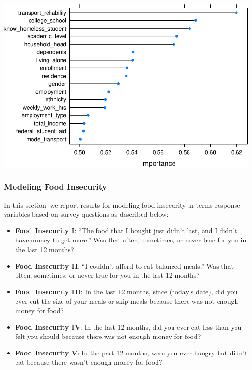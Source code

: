 \documentclass[
  10pt,
]{article}
\begin{document}
\includegraphics{phase2_report_files/figure-latex/unnamed-chunk-12-1}

\hypertarget{modeling-food-insecurity}{%
\subsubsection{Modeling Food Insecurity}\label{modeling-food-insecurity}}

In this section, we report results for modeling food insecurity in terms response variables based on survey questions as described below:

\begin{itemize}
\item
  \textbf{Food Insecurity I}: ``The food that I bought just didn't last, and I didn't have money to get more.'' Was that often, sometimes, or never true for you in the last 12 months?
\item
  \textbf{Food Insecurity II}: ``I couldn't afford to eat balanced meals.'' Was that often, sometimes, or never true for you in the last 12 months?
\item
  \textbf{Food Insecurity III}: In the last 12 months, since (today's date), did you ever cut the size of your meals or skip meals because there was not enough money for food?
\item
  \textbf{Food Insecurity IV}: In the last 12 months, did you ever eat less than you felt you should because there was not enough money for food?
\item
  \textbf{Food Insecurity V}: In the past 12 months, were you ever hungry but didn't eat because there wasn't enough money for food?
\end{itemize}
\end{document}
